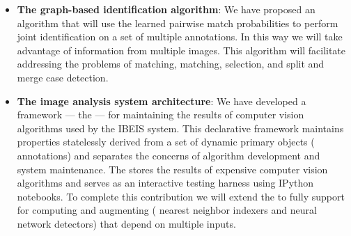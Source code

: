 \begin{itemize}

           \item \textbf{The graph-based identification algorithm}:
                We have proposed an algorithm that will use the learned
                  pairwise match probabilities to perform joint identification
                  on a set of multiple annotations.
                In this way we will take advantage of information from
                  multiple images.
                This algorithm will facilitate addressing the problems of
                  \intraoccurrence{} matching, \vsexemplar{} matching,
                  \exemplar{} selection, and split and merge case detection.

            \item \textbf{The image analysis system architecture}:
                We have developed a framework --- the \depcache{} --- for
                  maintaining the results of computer vision algorithms used by
                  the IBEIS{} system.
                This declarative framework maintains properties statelessly
                  derived from a set of dynamic primary objects (\eg{}
                  annotations{}) and separates the concerns of algorithm
                  development and system maintenance.
                The \depcache{} stores the results of expensive computer
                  vision algorithms and serves as an interactive testing harness
                  using IPython notebooks.
                To complete this contribution we will extend the \depcache{}
                  to fully support for computing and augmenting (\eg{} nearest
                  neighbor indexers and neural network detectors) that depend on
                  multiple inputs.


      \end{itemize}

